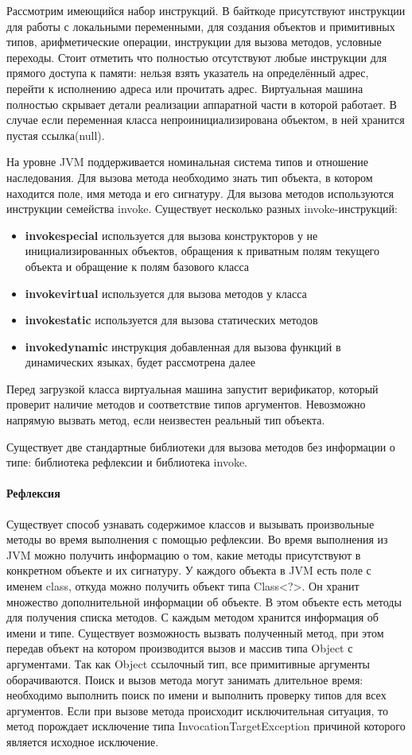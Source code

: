 Рассмотрим имеющийся набор инструкций. В байткоде присутствуют инструкции для работы с локальными переменными, для создания объектов и примитивных типов, арифметические операции, инструкции для вызова методов, условные переходы. Стоит отметить что полностью отсутствуют любые инструкции для прямого доступа к памяти: нельзя взять указатель на определённый адрес, перейти к исполнению адреса или прочитать адрес. Виртуальная машина полностью скрывает детали реализации аппаратной части в которой работает. В случае если переменная класса непроинициализирована объектом, в ней хранится пустая ссылка(null).

На уровне JVM поддерживается номинальная система типов и отношение наследования. Для вызова метода необходимо знать тип объекта, в котором находится поле, имя метода и его сигнатуру. Для вызова методов используются инструкции семейства invoke. Существует несколько разных invoke-инструкций:
\begin{itemize}
    \item \textbf{invokespecial} используется для вызова конструкторов у не инициализированных объектов, обращения к приватным полям текущего объекта и обращение к полям базового класса
    \item \textbf{invokevirtual} используется для вызова методов у класса
    \item \textbf{invokestatic} используется для вызова статических методов
    \item \textbf{invokedynamic} инструкция добавленная для вызова функций в динамических языках, будет рассмотрена далее
\end{itemize}
Перед загрузкой класса виртуальная машина запустит верификатор, который проверит наличие методов и соответствие типов аргументов. Невозможно напрямую вызвать метод, если неизвестен реальный тип объекта.

Существует две стандартные библиотеки для вызова методов без информации о типе: библиотека рефлексии и библиотека invoke.
\paragraph{Рефлексия}
Существует способ узнавать содержимое классов и вызывать произвольные методы во время выполнения с помощью рефлексии\cite{jvm:reflection}. Во время выполнения из JVM можно получить информацию о том, какие методы присутствуют в конкретном объекте и их сигнатуру. У каждого объекта в JVM есть поле с именем class, откуда можно получить объект типа Class<?>. Он хранит множество дополнительной информации об объекте. В этом объекте есть методы для получения списка методов. С каждым методом хранится информация об имени и типе. Существует возможность вызвать полученный метод, при этом передав объект на котором производится вызов и массив типа Object с аргументами. Так как Object ссылочный тип, все примитивные аргументы оборачиваются. Поиск и вызов метода могут занимать длительное время: необходимо выполнить поиск по имени и выполнить проверку типов для всех аргументов. Если при вызове метода происходит исключительная ситуация, то метод порождает исключение типа InvocationTargetException причиной которого является исходное исключение.

